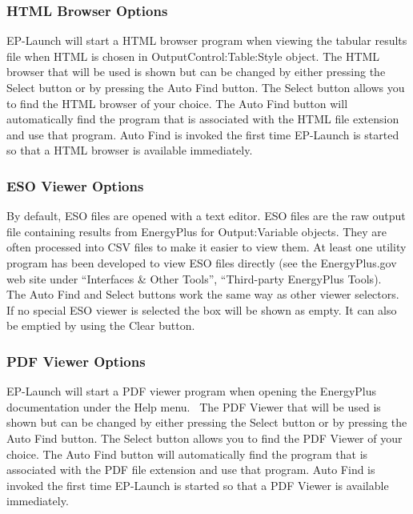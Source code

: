 \subsubsection{HTML Browser Options}\label{html-browser-options}

EP-Launch will start a HTML browser program when viewing the tabular results file when HTML is chosen in OutputControl:Table:Style object. The HTML browser that will be used is shown but can be changed by either pressing the Select button or by pressing the Auto Find button. The Select button allows you to find the HTML browser of your choice. The Auto Find button will automatically find the program that is associated with the HTML file extension and use that program. Auto Find is invoked the first time EP-Launch is started so that a HTML browser is available immediately.

\subsubsection{ESO Viewer Options}\label{eso-viewer-options}

By default, ESO files are opened with a text editor. ESO files are the raw output file containing results from EnergyPlus for Output:Variable objects. They are often processed into CSV files to make it easier to view them. At least one utility program has been developed to view ESO files directly (see the EnergyPlus.gov web site under ``Interfaces \& Other Tools'', ``Third-party EnergyPlus Tools).~ The Auto Find and Select buttons work the same way as other viewer selectors. If no special ESO viewer is selected the box will be shown as empty. It can also be emptied by using the Clear button.

\subsubsection{PDF Viewer Options}\label{pdf-viewer-options}

EP-Launch will start a PDF viewer program when opening the EnergyPlus documentation under the Help menu.~ The PDF Viewer that will be used is shown but can be changed by either pressing the Select button or by pressing the Auto Find button. The Select button allows you to find the PDF Viewer of your choice. The Auto Find button will automatically find the program that is associated with the PDF file extension and use that program. Auto Find is invoked the first time EP-Launch is started so that a PDF Viewer is available immediately.

